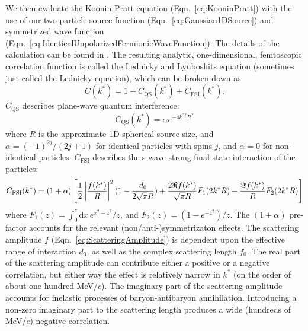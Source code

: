 We then evaluate the Koonin-Pratt equation (Eqn.\ \ref{eq:KooninPratt}) with the use of our two-particle source function (Eqn.\ \ref{eq:Gaussian1DSource}) and symmetrized wave function (Eqn.\ \ref{eq:IdenticalUnpolarizedFermionicWaveFunction}).
The details of the calculation can be found in \cite{lednicky82}.
The resulting analytic, one-dimensional, femtoscopic correlation function is called the Lednicky and Lyuboshits equation (sometimes just called the Lednicky equation), which can be broken down as
\begin{equation}
\label{eq:GeneralCorrelationFunction}
C(k^*)= 1 + C_{\mathrm{QS}}(k^*)+C_{\mathrm{FSI}}(k^*).
\end{equation}
$C_{\mathrm{QS}}$ describes plane-wave quantum interference:
\begin{equation}
C_{\mathrm{QS}}(k^*) = \alpha e^{-4k^{*2}R^2}
\end{equation}
where $R$ is the approximate 1D spherical source size, and $\alpha = (-1)^{2j}/(2j+1)$ for identical particles with spins $j$, and $\alpha = 0$ for non-identical particles.
$C_{\mathrm{FSI}}$ describes the s-wave strong final state interaction of the particles:
\begin{equation}
\label{eq:Lednicky}
C_{\mathrm{FSI}}(k^*)= (1+\alpha)\left[\frac{1}{2}\left\lvert\frac{f(k^*)}{R}\right\rvert^2(1-\frac{d_0}{2\sqrt{\pi}R})+\frac{2\Re f(k^*)}{\sqrt{\pi}R}F_1(2k^*R)-\frac{\Im f(k^*)}{R}F_2(2k^*R)\right]
\end{equation}
where $F_1(z) = \int_0^z \! \mathrm{d}x \, e^{x^2-z^2}/z$, and $F_2(z) = (1-e^{-z^2})/z$.
The $(1+\alpha)$ pre-factor accounts for the relevant (non/anti-)symmetrizaton effects.
The scattering amplitude $f$ (Eqn.\ \ref{eq:ScatteringAmplitude}) is dependent upon the effective range of interaction $d_0$, as well as the complex scattering length $f_0$.  
The real part of the scattering amplitude can contribute either a positive or a negative correlation, but either way the effect is relatively narrow in $k^*$ (on the order of about one hundred MeV/$c$).  
The imaginary part of the scattering amplitude accounts for inelastic processes of baryon-antibaryon annihilation.  
Introducing a non-zero imaginary part to the scattering length produces a wide (hundreds of MeV/$c$) negative correlation.  


